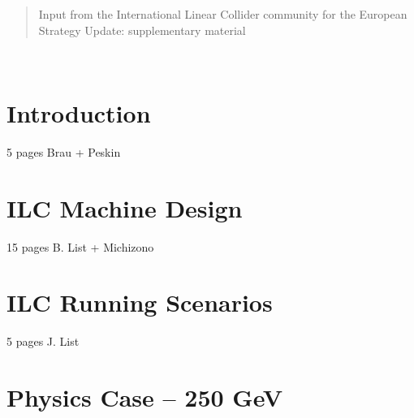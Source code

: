 \documentclass[%
 reprint,
nofootinbib,
 amsmath,amssymb,
 aps,
]{revtex4-1}
\begin{document}
%


\date{\today}%

\begin{abstract}
Input from the International Linear Collider community for the European Strategy Update: supplementary material

\end{abstract}

\maketitle

\tableofcontents

\clearpage
\newpage
\mbox{~}


\section{\label{sec:intro}Introduction}
   5 pages Brau + Peskin
   
   

   
\section{\label{sec:ilc}ILC Machine Design}

  15 pages B. List + Michizono
  

  
\section{\label{sec:runscenarios}ILC Running Scenarios  }
   5 pages J. List
   

   
   
\section{\label{sec:physics}Physics Case -- 250 GeV }
\end{document}
